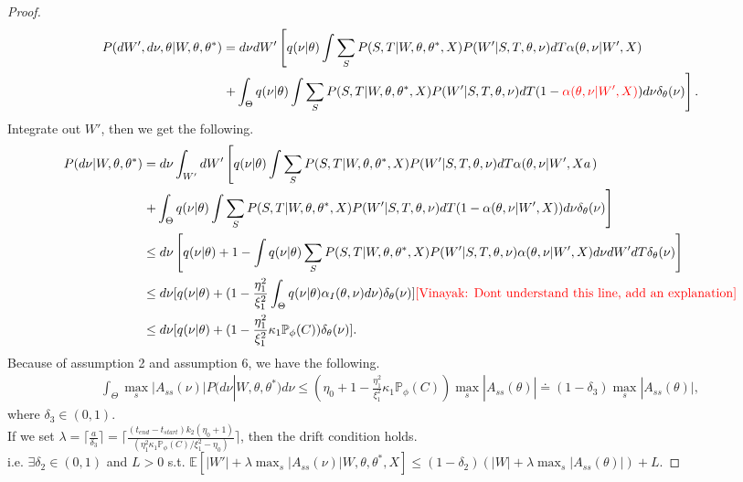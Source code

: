 \begin{proof}
\begin{align*}
P(dW', d\nu, \theta | W, \theta, \theta^*) &=d\nu dW' \left[q(\nu | \theta) \int \sum_S P(S, T | W, \theta, \theta^*, X)P(W' | S, T, \theta, \nu)dT\alpha(\theta, \nu | W', X)\right. \\
                                           &\left.+ \int_\Theta q(\nu | \theta) \int \sum_S P(S, T | W, \theta, \theta^*, X)P(W' | S, T, \theta, \nu)dT ( 1 - {\color{red} \alpha(\theta, \nu | W', X)})d\nu \delta_\theta(\nu)\right].
\end{align*}
Integrate out $W'$, then we get the following.
\begin{align*}
P(d\nu| W, \theta, \theta^*) &=d\nu \int_{W'}dW' \left[q(\nu | \theta) \int \sum_S P(S, T | W, \theta, \theta^*, X)P(W' | S, T, \theta, \nu)dT\alpha(\theta, \nu | W', Xa\right.)\\
&\left. + \int_\Theta q(\nu | \theta) \int \sum_S P(S, T | W, \theta, \theta^*, X)P(W' | S, T, \theta, \nu)dT ( 1 - \alpha(\theta, \nu | W', X))d\nu \delta_\theta(\nu)\right]\\
&\leq d\nu\left[q(\nu | \theta) +1 -  \int q(\nu | \theta) \sum_S P(S, T|W, \theta, \theta^*, X)P(W'|S, T, \theta, \nu)\alpha(\theta, \nu | W', X)d\nu dW' dT \delta_\theta(\nu)\right]\\
                             & \leq d\nu [q(\nu | \theta) + (1 - \frac{\eta_1^2}{\xi_1^2} \int_\Theta q(\nu | \theta)\alpha_I(\theta, \nu)d\nu)\delta_\theta(\nu)] \text{\textcolor{red}{[Vinayak: Dont understand this line, add an explanation]}}\\
& \leq d\nu [q(\nu | \theta) + (1 - \frac{\eta_1^2}{\xi_1^2} \kappa_1 \mathbb{P}_\phi(C))\delta_\theta(\nu)].
\end{align*}
Because of assumption 2 and assumption 6, we have the following.
\begin{align*}
\int_\Theta \max_s|A_{ss}(\nu)|P(d\nu| W, \theta, \theta^*) d\nu \leq (\eta_0 + 1 - \frac{\eta_1^2}{\xi_1^2} \kappa_1 \mathbb{P}_\phi(C)) \max_s|A_{ss}(\theta)| \doteq (1 - \delta_3) \max_s|A_{ss}(\theta)|,
\end{align*}
where $\delta_3 \in (0, 1)$.\\
If we set  $\lambda = \lceil\frac{a}{\delta_3} \rceil = \lceil \frac{(t_{end} - t_{start})k_2(\eta_0 + 1)}{(\eta_1^2 \kappa_1 \mathbb{P}_\phi(C)/\xi_1^2 - \eta_0)} \rceil$, then the drift condition holds.\\
i.e. $\exists \delta_2 \in (0, 1)$ and $L > 0$ s.t. $\mathbb{E}[|W'| + \lambda\max_s|A_{ss}(\nu)  | W, \theta, \theta^*, X] \leq (1 - \delta_2)(|W| + \lambda \max_s|A_{ss}(\theta)| ) + L$. 
\end{proof}
